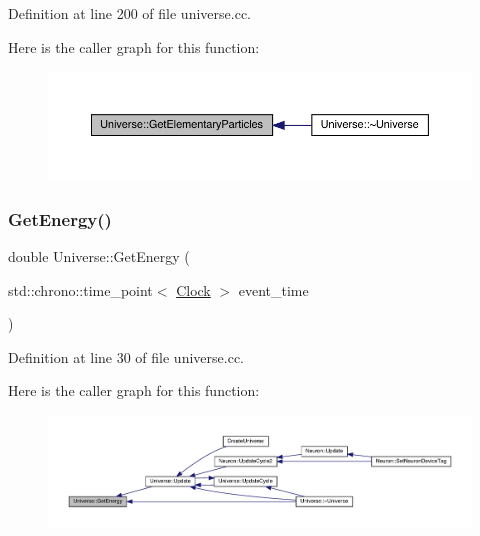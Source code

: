 Definition at line 200 of file universe.\+cc.

Here is the caller graph for this function\+:
\nopagebreak
\begin{figure}[H]
\begin{center}
\leavevmode
\includegraphics[width=350pt]{class_universe_a168fd9bf7602adcba1de5dd93a212775_icgraph}
\end{center}
\end{figure}
\mbox{\label{class_universe_a3b25e7ce6552991b7d5e6a9eb6e8a7ff}} 
\subsubsection{\texorpdfstring{Get\+Energy()}{GetEnergy()}}
{\footnotesize\ttfamily double Universe\+::\+Get\+Energy (\begin{DoxyParamCaption}\item[{std\+::chrono\+::time\+\_\+point$<$ \hyperlink{universe_8h_a0ef8d951d1ca5ab3cfaf7ab4c7a6fd80}{Clock} $>$}]{event\+\_\+time }\end{DoxyParamCaption})}



Definition at line 30 of file universe.\+cc.

Here is the caller graph for this function\+:
\nopagebreak
\begin{figure}[H]
\begin{center}
\leavevmode
\includegraphics[width=350pt]{class_universe_a3b25e7ce6552991b7d5e6a9eb6e8a7ff_icgraph}
\end{center}
\end{figure}
\mbox{\label{class_universe_ab0404e774ee0ed66b597ff5b8e989446}} 
